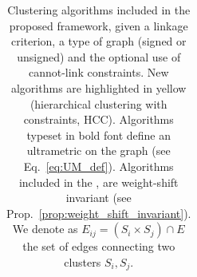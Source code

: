 \begin{table}[t]
\begin{subtable}[t!]{\textwidth}
\begin{tabular}{l |c  c  c  c  c}
            
             


             





        \end{tabular}
    \end{subtable} 
    \caption{Clustering algorithms included in the proposed \algname{} framework, given a linkage criterion, a type of graph (signed or unsigned) and the optional use of cannot-link constraints. New algorithms are highlighted in yellow (hierarchical clustering with constraints, HCC). Algorithms typeset in bold font define an ultrametric on the graph (see Eq.~\ref{eq:UM_def}). Algorithms included in the , are weight-shift invariant (see Prop.~\ref{prop:weight_shift_invariant}). 
    We denote as $E_{ij}=(S_i \times S_{j}) \cap E$ the set of edges connecting two clusters $S_i, S_j$. } 
    \label{tab:linkage-criteria}
\end{table}



